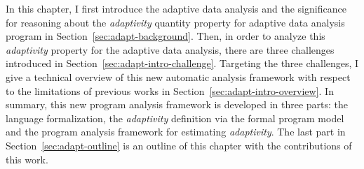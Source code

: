 In this chapter, 
I first introduce the adaptive data analysis and the
significance for reasoning about the \emph{adaptivity} quantity property 
for adaptive data analysis program in Section~\ref{sec:adapt-background}.
Then, in order to analyze this \emph{adaptivity} property for the adaptive data analysis,
there are three challenges
introduced in Section~\ref{sec:adapt-intro-challenge}.
Targeting the three challenges, I give a technical overview of this new automatic analysis framework with respect to
the limitations of previous works
in Section~\ref{sec:adapt-intro-overview}.
In summary, this new program analysis framework is developed in three parts:
the language formalization,
the \emph{adaptivity} definition via the formal program model and
the program analysis framework for estimating \emph{adaptivity}.
The last part in Section~\ref{sec:adapt-outline} is an outline of this chapter with the contributions of this work.



